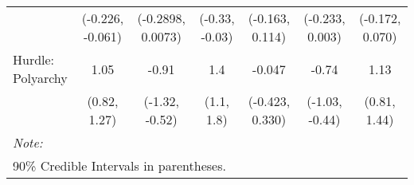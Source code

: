 \begin{table}[H]
\begin{tabular}[t]{lcccccc}
 & (-0.226, -0.061) & (-0.2898, 0.0073) & (-0.33, -0.03) & (-0.163, 0.114) & (-0.233, 0.003) & (-0.172, 0.070)\\
Hurdle: Polyarchy & 1.05 & -0.91 & 1.4 & -0.047 & -0.74 & 1.13\\
 & (0.82, 1.27) & (-1.32, -0.52) & (1.1, 1.8) & (-0.423, 0.330) & (-1.03, -0.44) & (0.81, 1.44)\\
\bottomrule
\multicolumn{7}{l}{\rule{0pt}{1em}\textit{Note: }}\\
\multicolumn{7}{l}{\rule{0pt}{1em}90\% Credible Intervals in parentheses.}\\
\end{tabular}
\end{table}

